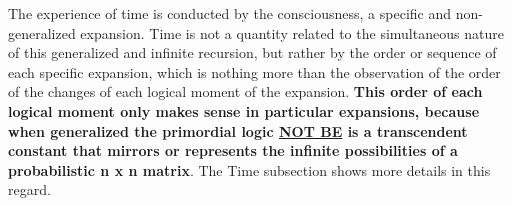 The experience of time is conducted by the consciousness, a specific and non-generalized expansion. Time is not a quantity related to the simultaneous nature of this generalized and infinite recursion, but rather by the order or sequence of each specific expansion, which is nothing more than the observation of the order of the changes of each logical moment of the expansion. \textbf{This order of each logical moment only makes sense in particular expansions, because when generalized the primordial logic \underline{NOT BE} is a transcendent constant that mirrors or represents the infinite possibilities of a probabilistic n x n matrix}. The Time subsection shows more details in this regard.








